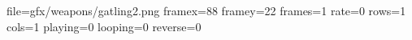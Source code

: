 file=gfx/weapons/gatling2.png
framex=88
framey=22
frames=1
rate=0
rows=1
cols=1
playing=0
looping=0
reverse=0
